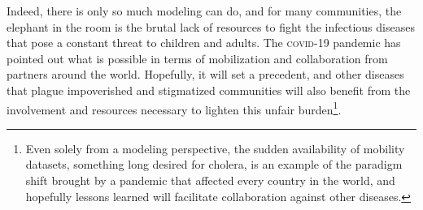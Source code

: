 Indeed, there is only so much modeling can do, and for many communities, the elephant in the room is the brutal lack of resources to fight the infectious diseases that pose a constant threat to children and adults. The \textsc{covid}-19 pandemic has pointed out what is possible in terms of mobilization and collaboration from partners around the world. Hopefully, it will set a precedent, and other diseases that plague impoverished and stigmatized communities will also benefit from the involvement and resources necessary to lighten this unfair burden\footnote[][-2\baselineskip]{Even solely from a modeling perspective, the sudden availability of mobility datasets, something long desired for cholera, is an example of the paradigm shift brought by a pandemic that affected every country in the world, and hopefully lessons learned will facilitate collaboration against other diseases.}. 


